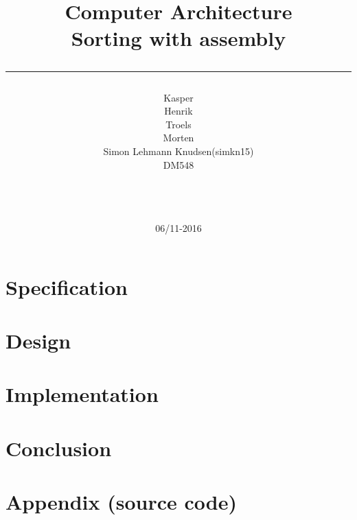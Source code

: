 \documentclass[a4paper,10pt]{article}
\title{Computer Architecture \\Sorting with assembly \\\rule{10cm}{0.5mm}}
\author{Kasper\\Henrik\\Troels\\Morten\\Simon Lehmann Knudsen(simkn15)
\\ DM548\\\rule{5.5cm}{0.5mm}\\}
\date{06/11-2016}
\begin{document}
\maketitle

\vfill

\newpage
\tableofcontents

\newpage
\section{Specification}

\section{Design}

\section{Implementation}

\section{Conclusion} 

\section{Appendix (source code)}
\end{document}
